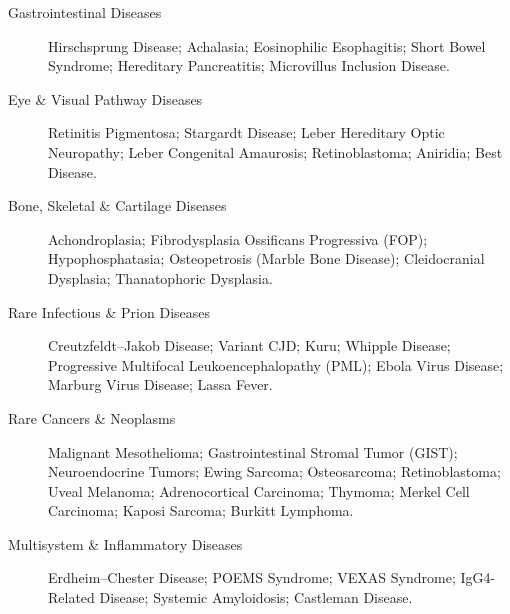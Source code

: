 \begin{description}
\item[Gastrointestinal Diseases] Hirschsprung Disease; Achalasia; Eosinophilic Esophagitis; Short Bowel Syndrome; Hereditary Pancreatitis; Microvillus Inclusion Disease.

\item[Eye \& Visual Pathway Diseases] Retinitis Pigmentosa; Stargardt Disease; Leber Hereditary Optic Neuropathy; Leber Congenital Amaurosis; Retinoblastoma; Aniridia; Best Disease.

\item[Bone, Skeletal \& Cartilage Diseases] Achondroplasia; Fibrodysplasia Ossificans Progressiva (FOP); Hypophosphatasia; Osteopetrosis (Marble Bone Disease); Cleidocranial Dysplasia; Thanatophoric Dysplasia.

\item[Rare Infectious \& Prion Diseases] Creutzfeldt–Jakob Disease; Variant CJD; Kuru; Whipple Disease; Progressive Multifocal Leukoencephalopathy (PML); Ebola Virus Disease; Marburg Virus Disease; Lassa Fever.

\item[Rare Cancers \& Neoplasms] Malignant Mesothelioma; Gastrointestinal Stromal Tumor (GIST); Neuroendocrine Tumors; Ewing Sarcoma; Osteosarcoma; Retinoblastoma; Uveal Melanoma; Adrenocortical Carcinoma; Thymoma; Merkel Cell Carcinoma; Kaposi Sarcoma; Burkitt Lymphoma.

\item[Multisystem \& Inflammatory Diseases] Erdheim–Chester Disease; POEMS Syndrome; VEXAS Syndrome; IgG4-Related Disease; Systemic Amyloidosis; Castleman Disease.
\end{description}
